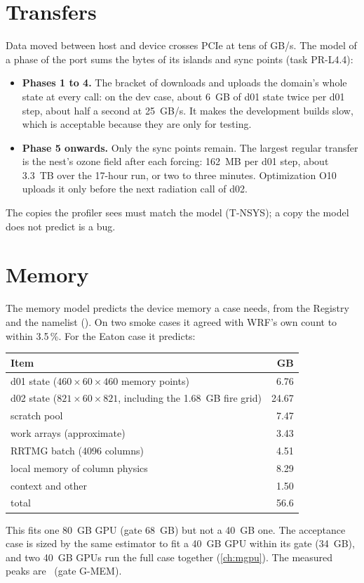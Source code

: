 \section{Transfers}

Data moved between host and device crosses PCIe at tens of GB/s. The model of a phase of the port sums the bytes of
its islands and sync points (task PR-L4.4):
\begin{itemize}
  \item \textbf{Phases 1 to 4.} The bracket of  downloads and uploads the domain's whole state at every
    call: on the dev case, about 6~GB of d01 state twice per d01 step, about half a second at 25~GB/s. It makes the
    development builds slow, which is acceptable because they are only for testing.
  \item \textbf{Phase 5 onwards.} Only the sync points remain. The largest regular transfer is the nest's ozone field
    after each forcing: 162~MB per d01 step, about 3.3~TB over the 17-hour run, or two to three minutes. Optimization
    O10 uploads it only before the next radiation call of d02.
\end{itemize}
The copies the profiler sees must match the model (T-NSYS); a copy the model does not predict is a bug.

\section{Memory}

The memory model predicts the device memory a case needs, from the Registry and the namelist
(). On two smoke cases it agreed with WRF's own count to within 3.5\,\%. For the
Eaton case it predicts:
\begin{center}
\small
\begin{tabular}{lr}
\toprule
Item & GB \\
\midrule
d01 state ($460 \times 60 \times 460$ memory points) & 6.76 \\
d02 state ($821 \times 60 \times 821$, including the 1.68~GB fire grid) & 24.67 \\
scratch pool & 7.47 \\
work arrays (approximate) & 3.43 \\
RRTMG batch (4096 columns) & 4.51 \\
local memory of column physics & 8.29 \\
context and other & 1.50 \\
\midrule
total & 56.6 \\
\bottomrule
\end{tabular}
\end{center}
This fits one 80~GB GPU (gate 68~GB) but not a 40~GB one. The acceptance case  is sized by the
same estimator to fit a 40~GB GPU within its gate (34~GB), and two 40~GB GPUs run the full case together
(\cref{ch:mgpu}). The measured peaks are \tbr\ (gate G-MEM).

